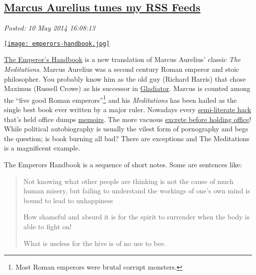 %

\subsection*{\href{https://bakerjd99.wordpress.com/2014/05/10/marcus-aurelius-tunes-my-rss-feeds/}{Marcus Aurelius tunes my RSS Feeds}}


\noindent\emph{Posted: 10 May 2014 16:08:13}
\vspace{6pt}


\captionsetup[floatingfigure]{labelformat=empty}
\begin{floatingfigure}[l]{0.205\textwidth}
\centering
\href{http://www.barnesandnoble.com/w/emperors-handbook-marcus-aurelius/1115032739?ean=9780743233835}{\texttt{[image: emperors-handbook.jpg]}}
\label{fig:4682X0}
\end{floatingfigure} \href{http://www.amazon.com/The-Emperors-Handbook-Translation-Meditations/dp/0743233832}{The
Emperor's Handbook} is a new translation of Marcus Aurelius' classic
\emph{The Meditations}. Marcus Aurelius was a second century Roman
emperor and stoic philosopher. You probably know him as the old guy
(Richard Harris) that chose Maximus (Russell Crowe) as his successor in
\href{http://en.wikipedia.org/wiki/Gladiator_(2000_film)}{Gladiator}.
Marcus is counted among the ``five good Roman emperors''\footnote{
Most Roman emperors were brutal corrupt monsters.
} and his
\emph{Meditations} has been hailed as the single best book ever written
by a major ruler. Nowadays every
\href{http://www.amazon.com/Decision-Points-George-W-Bush/dp/0307590631}{semi-literate
hack} that's held office
dumps \href{http://en.wikipedia.org/wiki/My_Life_(Bill_Clinton_autobiography)}{memoirs}.
The more vacuous
\href{http://www.goodreads.com/book/show/88061.Dreams_from_My_Father}{excrete
before holding office}! While political autobiography is usually the
vilest form of pornography and begs the question; is book burning all
bad? There are exceptions and The Meditations is a magnificent example.

\medskip
The Emperors Handbook is a sequence of short notes. Some are sentences
like:

\begin{quote}
Not knowing what other people are thinking is not the cause of much
human misery, but failing to understand the workings of one's own mind
is bound to lead to unhappiness

How shameful and absurd it is for the spirit to surrender when the body
is able to fight on!

What is useless for the hive is of no use to bee.
\end{quote}

